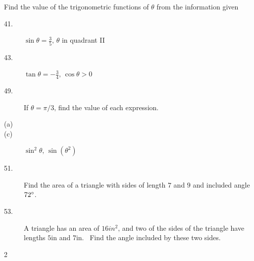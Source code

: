 Find the value of the trigonometric functions of $\theta $ from the information given 


\begin{description}
\item [41.] $\sin  \theta  =\frac{3}{5}\text{,}$ $\theta $ in quadrant II 

\item [43.]
$\tan  \theta  = -\frac{3}{4}\text{,}$ $\cos  \theta  >0$ 

\item [49.] If $\theta  =\pi /3\text{,}$ find the value of each expression. 

\item [(a)]
\columnsep =30pt
 

\item [(c)]
$\sin ^{2} \theta \text{,}$ $\sin  \left (\theta ^{2}\right )$ 

\item [51.] Find the area of a triangle
with sides of length $7$ and $9$ and included angle $72 \mbox{{\ensuremath{{}^\circ}}}$. 

\item [53.]
A triangle has an area of $16 in^{2}\text{,}$ and two of the sides of the triangle have lengths $5 \mbox{in}$ and $7 \mbox{in}$. \ Find the angle included by these two sides. \end{description}


\columnsep =30pt
\begin {multicols}{2}
 


\end {multicols}
 


